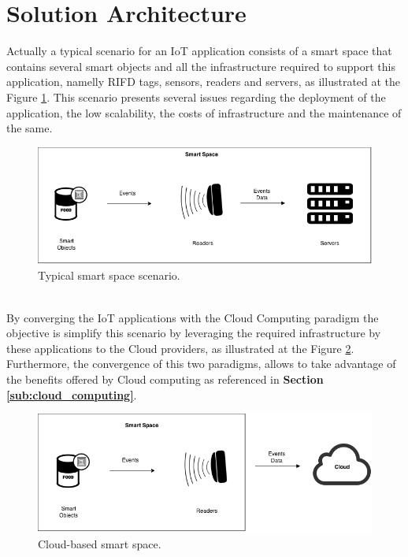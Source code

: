 \section{Solution Architecture}
\label{sec:solution_architecture}
Actually a typical scenario for an IoT application consists of a smart space that contains several smart objects and all
the infrastructure required to support this application, namelly RIFD tags, sensors, readers and servers, as illustrated at the
Figure \ref{fig:smart-space}. This scenario presents several issues regarding the deployment of the application, the low scalability, the costs of infrastructure
and the maintenance of the same.
\begin{figure}[h!]
  \centering
  \includegraphics[width=\textwidth]{./images/smart-space}
  \caption{Typical smart space scenario.}
  \label{fig:smart-space}
\end{figure}\\
By converging the IoT applications with the Cloud Computing paradigm the objective is simplify this scenario by leveraging the required infrastructure by these applications to the Cloud providers,
as illustrated at the Figure \ref{fig:smart-space-cloud}. Furthermore, the convergence of this two paradigms, allows to take advantage of the benefits offered by Cloud computing as referenced
in \textbf{Section \ref{sub:cloud_computing}}.
\begin{figure}
  \centering
  \includegraphics[width=\textwidth]{./images/smart-space-cloud}
  \caption{Cloud-based smart space.}
  \label{fig:smart-space-cloud}
\end{figure}\\
